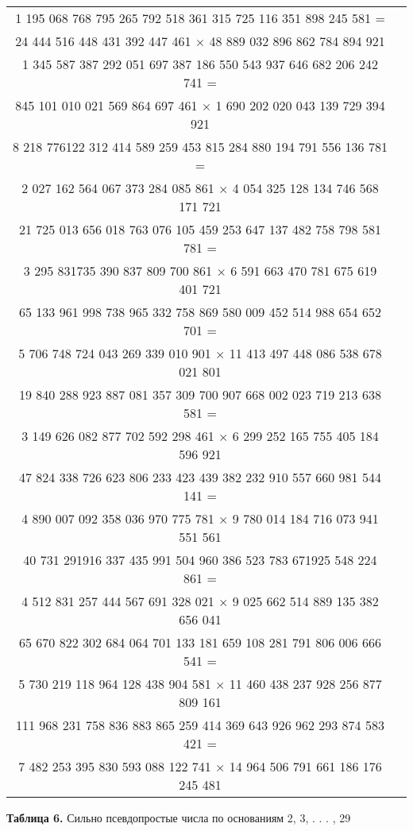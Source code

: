 \documentclass{mai_book}
\begin{document}
 	\begin{tabular}{|c|l|}
 		\hline
 		1 195 068 768 795 265 792 518 361 315 725 116 351 898 245 581 = \\ 24 444 516 448 431 392 447 461 $\times$ 48 889 032 896 862 784 894 921 \\
 		\hline
 		1 345 587 387 292 051 697 387 186 550 543 937 646 682 206 242 741 = \\ 845 101 010 021 569 864 697 461 $\times$ 1 690 202 020 043 139 729 394 921 \\
 		\hline
 		8 218 776122 312 414 589 259 453 815 284 880 194 791 556 136 781 = \\ 2 027 162 564 067 373 284 085 861 $\times$ 4 054 325 128 134 746 568 171 721 \\
 		\hline
 		21 725 013 656 018 763 076 105 459 253 647 137 482 758 798 581 781 = \\ 3 295 831735 390 837 809 700 861 $\times$ 6 591 663 470 781 675 619 401 721 \\ 
 		\hline 
 		65 133 961 998 738 965 332 758 869 580 009 452 514 988 654 652 701 = \\ 5 706 748 724 043 269 339 010 901 $\times$ 11 413 497 448 086 538 678 021 801 \\ 
 		\hline
 		19 840 288 923 887 081 357 309 700 907 668 002 023 719 213 638 581 = \\ 3 149 626 082 877 702 592 298 461 $\times$ 6 299 252 165 755 405 184 596 921 \\ 
 		\hline
 		47 824 338 726 623 806 233 423 439 382 232 910 557 660 981 544 141 = \\ 4 890 007 092 358 036 970 775 781 $\times$ 9 780 014 184 716 073 941 551 561 \\ 
 		\hline
 		40 731 291916 337 435 991 504 960 386 523 783 671925 548 224 861 = \\ 4 512 831 257 444 567 691 328 021 $\times$ 9 025 662 514 889 135 382 656 041 \\ 
 		\hline
 		65 670 822 302 684 064 701 133 181 659 108 281 791 806 006 666 541 = \\ 5 730 219 118 964 128 438 904 581 $\times$ 11 460 438 237 928 256 877 809 161 \\ 
 		\hline
 		111 968 231 758 836 883 865 259 414 369 643 926 962 293 874 583 421 = \\ 7 482 253 395 830 593 088 122 741 $\times$ 14 964 506 791 661 186 176 245 481 \\
 		\hline
	\end{tabular}
	\begin{center}
		{\bf Таблица 6.} Сильно псевдопростые числа по основаниям 2, 3, . . . , 29
	\end{center}
\end{document}
